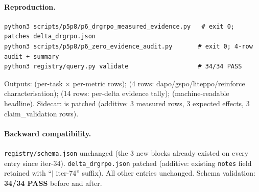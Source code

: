 \paragraph{Reproduction.}
\begin{lstlisting}[basicstyle=\ttfamily\scriptsize,breaklines=true]
python3 scripts/p5p8/p6_drgrpo_measured_evidence.py   # exit 0; patches delta_drgrpo.json
python3 scripts/p5p8/p6_zero_evidence_audit.py       # exit 0; 4-row audit + summary
python3 registry/query.py validate                   # 34/34 PASS
\end{lstlisting}
Outputs: 
(per-task $\times$ per-metric rows); 
(4 rows: dapo/gspo/liteppo/reinforce characterisation);
 (14 rows: per-delta
evidence tally); 
(machine-readable headline). Sidecar: 
is patched (additive: 3 measured rows, 3 expected effects,
3 claim\_validation rows).

\paragraph{Backward compatibility.}
\texttt{registry/schema.json} unchanged (the 3 new blocks already
existed on every entry since iter-34). \texttt{delta\_drgrpo.json}
patched (additive: existing \texttt{notes} field retained with
``$|$ iter-74'' suffix). All other entries unchanged. Schema
validation: \textbf{34/34 PASS} before and after.
